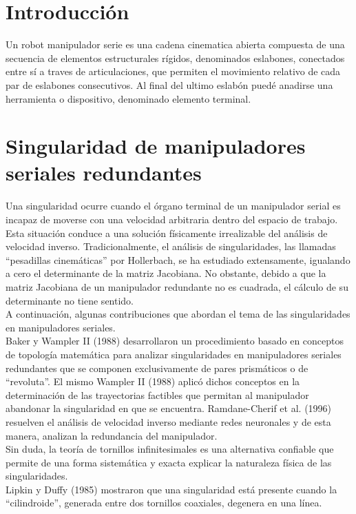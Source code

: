 \documentclass[12pt,a4paper]{article}
\begin{document}
\tableofcontents

\section{Introducción}
Un robot manipulador serie es una cadena cinematica abierta compuesta de una secuencia de elementos estructurales rígidos, denominados eslabones, conectados entre sí a traves de articulaciones, que permiten el movimiento relativo de cada par
de eslabones consecutivos. Al final del ultimo eslabón puedé anadirse una herramienta o dispositivo, denominado elemento terminal.\\

\section{Singularidad de manipuladores seriales redundantes
}
Una singularidad ocurre cuando el órgano terminal de un manipulador serial es incapaz de moverse con una velocidad arbitraria dentro del espacio de trabajo. \\
Esta situación conduce a una solución físicamente irrealizable del análisis de velocidad inverso. Tradicionalmente, el análisis de singularidades, las llamadas “pesadillas cinemáticas” por Hollerbach, se ha estudiado extensamente, igualando a cero el determinante de la matriz Jacobiana. No obstante, debido a que la matriz Jacobiana de un manipulador redundante no es cuadrada, el cálculo de su determinante no tiene sentido. \\
A continuación, algunas contribuciones que abordan el tema de las singularidades en manipuladores seriales. \\
Baker y Wampler II (1988) desarrollaron un procedimiento basado en conceptos de topología matemática para analizar singularidades en manipuladores seriales redundantes que se componen exclusivamente de pares prismáticos o de “revoluta”. El mismo Wampler II (1988) aplicó dichos conceptos en la determinación de las trayectorias factibles que permitan al manipulador abandonar la singularidad en que se encuentra. Ramdane-Cherif et al. (1996) resuelven el análisis de velocidad inverso mediante redes neuronales y de esta manera, analizan la redundancia del manipulador. \\
Sin duda, la teoría de tornillos infinitesimales es una alternativa confiable que permite de una forma sistemática y exacta explicar la naturaleza física de las singularidades. \\
Lipkin y Duffy (1985) mostraron que una singularidad está presente cuando la “cilindroide”, generada entre dos tornillos coaxiales, degenera en una línea. \\
\end{document}
